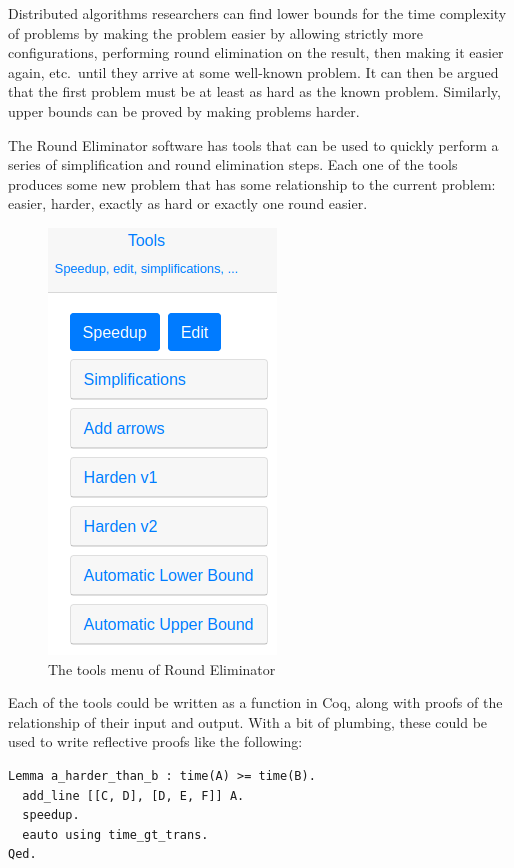 \documentclass[english, 12pt, a4paper, sci, a-1b, online]{aaltothesis}
\begin{document}
Distributed algorithms researchers can find lower bounds for the time complexity of problems by making the problem easier by allowing strictly more configurations, performing round elimination on the result, then making it easier again, etc.\ until they arrive at some well-known problem. It can then be argued that the first problem must be at least as hard as the known problem. Similarly, upper bounds can be proved by making problems harder.

The Round Eliminator software has tools that can be used to quickly perform a series of simplification and round elimination steps. Each one of the tools produces some new problem that has some relationship to the current problem: easier, harder, exactly as hard or exactly one round easier.

\begin{figure}[h]
  \centering
  \includegraphics[scale=0.5]{retools}
  \caption{The tools menu of Round Eliminator}
\end{figure}

Each of the tools could be written as a function in Coq, along with proofs of the relationship of their input and output. With a bit of plumbing, these could be used to write reflective proofs like the following:

\begin{verbatim}
Lemma a_harder_than_b : time(A) >= time(B).
  add_line [[C, D], [D, E, F]] A.
  speedup.
  eauto using time_gt_trans.
Qed.
\end{verbatim}
\end{document}
